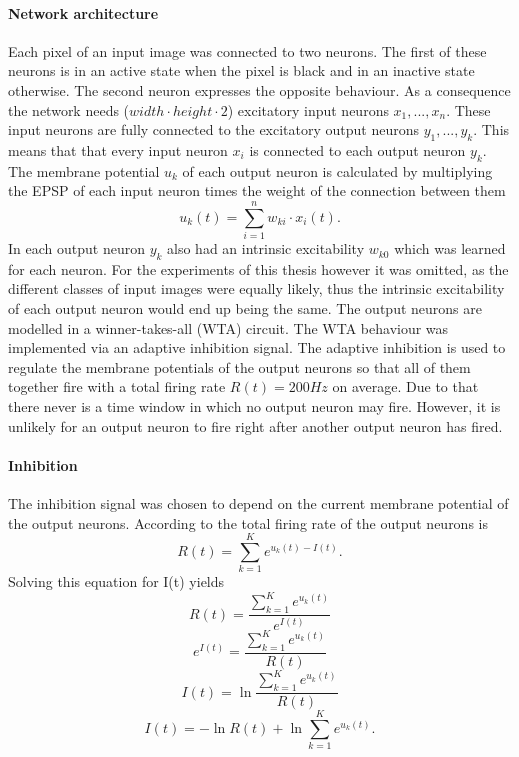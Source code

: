 \paragraph{Network architecture}
Each pixel of an input image was connected to two neurons. The first of these neurons is in an active state when the pixel is black and in an inactive state otherwise. The second neuron expresses the opposite behaviour. As a consequence the network needs ($width \cdot height \cdot 2$) excitatory input neurons $x_1,...,x_n$. These input neurons are fully connected to the excitatory output neurons $y_1,...,y_k$. This means that that every input neuron $x_i$ is connected to each output neuron $y_k$. The membrane potential $u_k$ of each output neuron is calculated by multiplying the EPSP of each input neuron times the weight of the connection between them
\begin{equation}
\label{eqn:uk}
u_k(t) = \sum_{i=1}^n w_{ki} \cdot x_i(t).
\end{equation}
In \citet{nessler} each output neuron $y_k$ also had an intrinsic excitability $w_{k0}$ which was learned for each neuron. For the experiments of this thesis however it was omitted, as the different classes of  input images were equally likely, thus the intrinsic excitability of each output neuron would end up being the same.
The output neurons are modelled in a winner-takes-all (WTA) circuit. The WTA behaviour was implemented via an adaptive inhibition signal. The adaptive inhibition is used to regulate
the membrane potentials of the output neurons so that all of them together fire with a total firing rate $R(t) = 200 Hz$ on average. Due to that there never is a time window in which no output neuron may fire. However, it is unlikely for an output neuron to fire right after another output neuron has fired.

\paragraph{Inhibition}
The inhibition signal was chosen to depend on the current membrane potential of the output neurons. According to \citet{nessler} the total firing rate of the output neurons is
\begin{equation}
\label{eqn:R}
R(t) = \sum_{k=1}^K e^{u_k(t) - I(t)}.
\end{equation}
Solving this equation for I(t) yields
\begin{equation}
\label{}
R(t) = \frac{ \sum_{k=1}^K e^{u_k(t)}}{e^{I(t)}}
\end{equation}
\begin{equation}
\label{}
e^{I(t)} = \frac{\sum_{k=1}^K e^{u_k(t)}}{R(t)}
\end{equation}
\begin{equation}
\label{}
I(t) = \ln{ \frac{ \sum_{k=1}^K e^{u_k(t)}}{R(t)}}
\end{equation}
\begin{equation}
\label{eqn:I(t)}
I(t) =  - \ln{R(t)} + \ln{  \sum_{k=1}^K e^{u_k(t)}}.
\end{equation}

